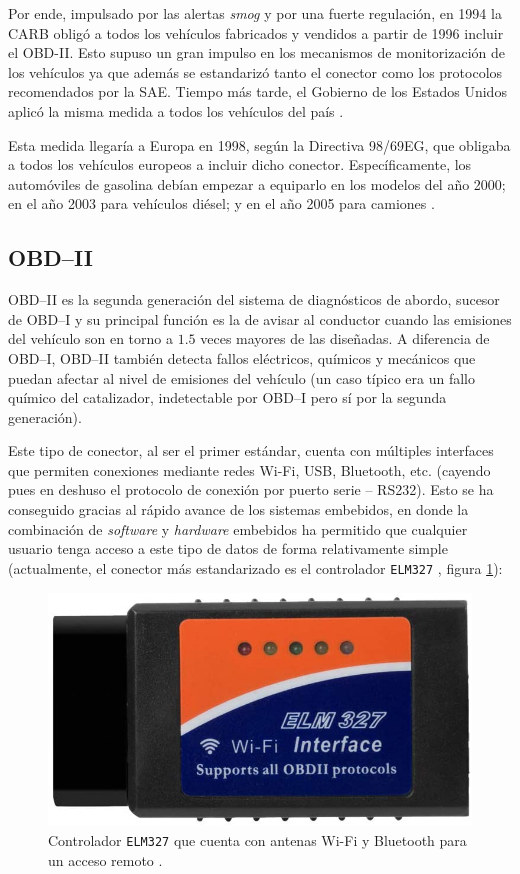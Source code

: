 Por ende, impulsado por las alertas \textit{smog} y por una fuerte regulación, en 1994
la \ac{CARB} obligó a todos los vehículos fabricados y vendidos a partir de 1996 incluir
el \ac{OBD}-II. Esto supuso un gran impulso en los mecanismos de monitorización de los
vehículos ya que además se estandarizó tanto el conector como los protocolos recomendados
por la \ac{SAE}. Tiempo más tarde, el Gobierno de los Estados Unidos aplicó la misma
medida a todos los vehículos del país \cite{SistemaOBD2Historia}.

Esta medida llegaría a Europa en 1998, según la Directiva 98/69EG, que obligaba a
todos los vehículos europeos a incluir dicho conector. Específicamente, los
automóviles de gasolina debían empezar a equiparlo en los modelos del año 2000; en el año 2003
para vehículos diésel; y en el año 2005 para camiones \cite{SistemaOBD2Historia}.

\subsection*{OBD--II}
\ac{OBD}--II es la segunda generación del sistema de diagnósticos de abordo, sucesor
de \ac{OBD}--I y su principal función es la de avisar al conductor cuando las
emisiones del vehículo son en torno a $1.5$ veces mayores de las diseñadas. A
diferencia de \ac{OBD}--I, \ac{OBD}--II también detecta fallos eléctricos, químicos
y mecánicos que puedan afectar al nivel de emisiones del vehículo (un caso típico
era un fallo químico del catalizador, indetectable por \ac{OBD}--I pero sí por la
segunda generación).

Este tipo de conector, al ser el primer estándar, cuenta con
múltiples interfaces que permiten conexiones mediante redes Wi-Fi, USB, Bluetooth,
etc. (cayendo pues en deshuso el protocolo de conexión por puerto serie -- RS232).
Esto se ha conseguido gracias al rápido avance de los sistemas embebidos, en donde
la combinación de \textit{software} y \textit{hardware} embebidos ha permitido que
cualquier usuario tenga acceso a este tipo de datos de forma relativamente simple
(actualmente, el conector más estandarizado es el controlador \texttt{ELM327} \cite{SistemaOBD2Historia},
figura \ref{fig:elm327}):

\begin{figure}[H]
  \centering
  \includegraphics[width=.7\linewidth]{images/obd-ii-elm327.jpg}
  \caption{Controlador \texttt{ELM327} que cuenta con antenas Wi-Fi y Bluetooth para un acceso remoto \cite{AmazonComElm327}.}
  \label{fig:elm327}
\end{figure}

